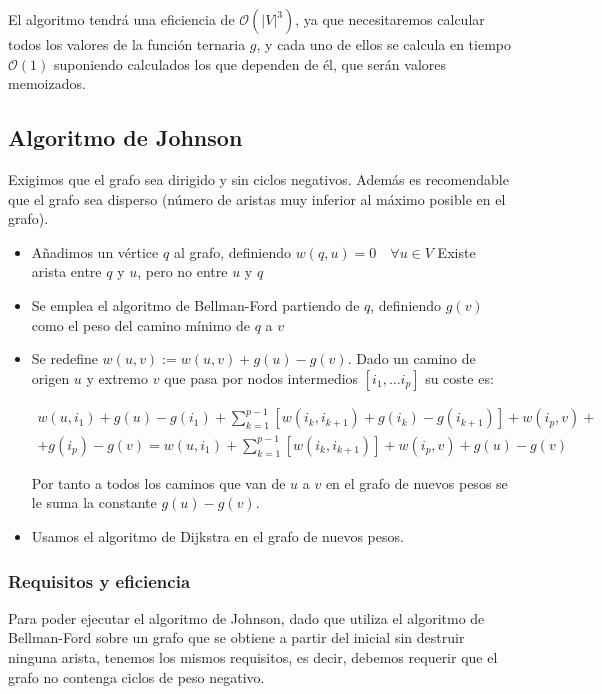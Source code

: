 \documentclass[a4paper, 11pt]{article} %
\begin{document}
      El algoritmo tendrá una eficiencia de $\mathcal{O}(|V|^3)$, ya que necesitaremos calcular
      todos los valores de la función ternaria $g$, y cada uno de ellos se calcula
      en tiempo $\mathcal{O}(1)$ suponiendo calculados los que dependen de él, que serán valores
      memoizados.
  
  
  \subsection{Algoritmo de Johnson}
      Exigimos que el grafo sea dirigido y sin ciclos negativos. Además es recomendable
      que el grafo sea  disperso (número de aristas muy inferior al máximo posible en el grafo).
      
      
    \begin{itemize}
      \item Añadimos un vértice $q$ al grafo, definiendo $w(q,u) = 0 \quad \forall u \in V$
	Existe arista entre $q$ y $u$, pero no entre $u$ y $q$
      \item Se emplea el algoritmo de Bellman-Ford partiendo de $q$, definiendo
	$g(v)$ como el peso del camino mínimo de $q$ a $v$
      \item Se redefine $w(u,v):=w(u,v) + g(u)-g(v)$. Dado un camino de origen $u$ y
	extremo $v$ que pasa por nodos intermedios $[i_1,\ldots i_p]$ su coste es:
	
	\begin{eqnarray*}
	w(u,i_1) + g(u) -g(i_1) + \sum_{k=1}^{p-1} [w(i_{k},i_{k+1}) + g(i_k) - g(i_{k+1})] + w(i_p,v) + \\
	+ g(i_p)- g(v) = w(u,i_1) + \sum_{k=1}^{p-1} [w(i_{k},i_{k+1})] + w(i_p,v) + g(u) - g(v)
	\end{eqnarray*}
	
	Por tanto a todos los caminos que van de $u$ a $v$ en el grafo de nuevos pesos
	se le suma la constante $g(u) - g(v)$.
      \item Usamos el algoritmo de Dijkstra en el grafo de nuevos pesos.
    \end{itemize}
    
      \subsubsection{Requisitos y eficiencia}
	Para poder ejecutar el algoritmo de Johnson, dado que utiliza el algoritmo de Bellman-Ford sobre un grafo
	que se obtiene a partir del inicial sin destruir ninguna arista, tenemos los mismos 
	requisitos, es decir, debemos requerir que el grafo no contenga ciclos de peso negativo.
	
\end{document}

